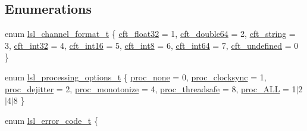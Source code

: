 \subsection*{Enumerations}
\begin{DoxyCompactItemize}
\item 
enum \hyperlink{namespacelsl_af188e978739868560b53dbf0ddd58e66}{lsl\+\_\+channel\+\_\+format\+\_\+t} \{ \newline
\hyperlink{namespacelsl_af188e978739868560b53dbf0ddd58e66aa95674227416b8ac1738687b32238d2f}{cft\+\_\+float32} = 1, 
\hyperlink{namespacelsl_af188e978739868560b53dbf0ddd58e66a5774bc95ff1f184ac12aff46fb7b68bc}{cft\+\_\+double64} = 2, 
\hyperlink{namespacelsl_af188e978739868560b53dbf0ddd58e66a6c5dce46d2515d637a2d25fb6bec4c00}{cft\+\_\+string} = 3, 
\hyperlink{namespacelsl_af188e978739868560b53dbf0ddd58e66a0953ae3a0b24ddcf260e0d21efede185}{cft\+\_\+int32} = 4, 
\newline
\hyperlink{namespacelsl_af188e978739868560b53dbf0ddd58e66a6476b2e6f58fdcb5e4614724fb9ab47c}{cft\+\_\+int16} = 5, 
\hyperlink{namespacelsl_af188e978739868560b53dbf0ddd58e66afe29bb90886dc301279506a17dad1c64}{cft\+\_\+int8} = 6, 
\hyperlink{namespacelsl_af188e978739868560b53dbf0ddd58e66a1c41c8b332c529710af7b3669256e24d}{cft\+\_\+int64} = 7, 
\hyperlink{namespacelsl_af188e978739868560b53dbf0ddd58e66a86446aa37b10c9094f36113fd2ff91a8}{cft\+\_\+undefined} = 0
 \}
\item 
enum \hyperlink{namespacelsl_a71fa5faeecfdd863828bdcd4117e736b}{lsl\+\_\+processing\+\_\+options\+\_\+t} \{ \newline
\hyperlink{namespacelsl_a71fa5faeecfdd863828bdcd4117e736bab96deb7b18bc02826a6cfec6007bcea2}{proc\+\_\+none} = 0, 
\hyperlink{namespacelsl_a71fa5faeecfdd863828bdcd4117e736baec0e5bf31072a78138faa6601786fd59}{proc\+\_\+clocksync} = 1, 
\hyperlink{namespacelsl_a71fa5faeecfdd863828bdcd4117e736baa29c9fe911f4bd26adc8d3b2c0b63d7e}{proc\+\_\+dejitter} = 2, 
\hyperlink{namespacelsl_a71fa5faeecfdd863828bdcd4117e736ba88bf55224b0d66a340e1715667e39844}{proc\+\_\+monotonize} = 4, 
\newline
\hyperlink{namespacelsl_a71fa5faeecfdd863828bdcd4117e736ba67d7ca683f860c6c2768d428e5aa9997}{proc\+\_\+threadsafe} = 8, 
\hyperlink{namespacelsl_a71fa5faeecfdd863828bdcd4117e736ba969800e5a22f6a2e0972e41c5d5f1069}{proc\+\_\+\+A\+LL} = 1$\vert$2$\vert$4$\vert$8
 \}
\item 
enum \hyperlink{namespacelsl_a7e674c7665887951b952c463258451a9}{lsl\+\_\+error\+\_\+code\+\_\+t} \{ \newline

\end{DoxyCompactItemize}
